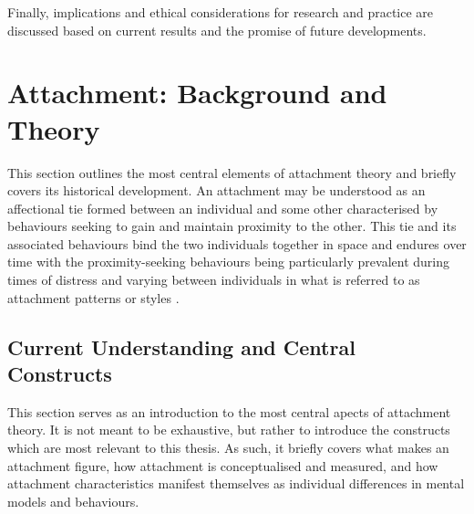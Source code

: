 \documentclass[12pt]{report}
\begin{document}
Finally, implications and ethical considerations for research and practice are discussed based on current results and the promise of future developments.

\chapter{Attachment: Background and Theory}
This section outlines the most central elements of attachment theory and briefly covers its historical development.
An attachment may be understood as an affectional tie formed between an individual and some other characterised by behaviours seeking to gain and maintain proximity to the other.
This tie and its associated behaviours bind the two individuals together in space and endures over time with the proximity-seeking behaviours being particularly prevalent during times of distress and varying between individuals in what is referred to as attachment patterns or styles \cite{Ainsworth1970,Bowlby1988}.

\section{Current Understanding and Central Constructs}
\label{sec: Current understanding}
This section serves as an introduction to the most central apects of attachment theory.
It is not meant to be exhaustive, but rather to introduce the constructs which are most relevant to this thesis.
As such, it briefly covers what makes an attachment figure, how attachment is conceptualised and measured, and how attachment characteristics manifest themselves as individual differences in mental models and behaviours.
\end{document}
